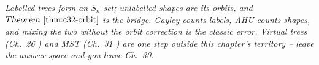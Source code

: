\begin{recallbox}
\emph{Labelled trees form an \(S_n\)-set; unlabelled shapes are its orbits,
and \(\thmref{c32-orbit}\) is the bridge.  Cayley counts labels, AHU counts
shapes, and mixing the two without the orbit correction is the classic
error.  Virtual trees (Ch.~26 ) and MST (Ch.~31 ) are
one step outside this chapter's territory -- leave the answer space and you
leave Ch.~30.}
\end{recallbox}
